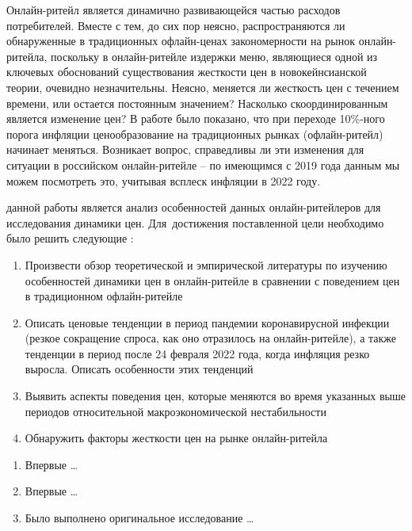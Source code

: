 Онлайн-ритейл является динамично развивающейся частью расходов потребителей. Вместе с тем, до сих пор неясно, распространяются ли обнаруженные в традиционных офлайн-ценах закономерности на рынок онлайн-ритейла, поскольку в онлайн-ритейле издержки меню, являющиеся одной из ключевых обоснований существования жесткости цен в новокейнсианской теории, очевидно незначительны. Неясно, меняется ли жесткость цен с течением времени, или остается постоянным значением? Насколько скоординированным является изменение цен? В работе \cite{gagnon2009} было показано, что при переходе 10\%-ного порога инфляции ценообразование на традиционных рынках (офлайн-ритейл) начинает меняться. Возникает вопрос, справедливы ли эти изменения для ситуации в российском онлайн-ритейле – по имеющимся с 2019 года данным мы можем посмотреть это, учитывая всплеск инфляции в 2022 году.


{\aim} данной работы является анализ особенностей данных онлайн-ритейлеров для исследования динамики цен.
Для~достижения поставленной цели необходимо было решить следующие {\tasks}:
\begin{enumerate}[beginpenalty=10000] %
  \item Произвести обзор теоретической и эмпирической литературы по изучению особенностей динамики цен в онлайн-ритейле в сравнении с поведением цен в традиционном офлайн-ритейле
  \item Описать ценовые тенденции в период пандемии коронавирусной инфекции (резкое сокращение спроса, как оно отразилось на онлайн-ритейле), а также тенденции в период после 24 февраля 2022 года, когда инфляция резко выросла. Описать особенности этих тенденций
  \item Выявить аспекты поведения цен, которые меняются во время указанных выше периодов относительной макроэкономической нестабильности
  \item Обнаружить факторы жесткости цен на рынке онлайн-ритейла 
\end{enumerate}


{\novelty}
\begin{enumerate}[beginpenalty=10000] %
  \item Впервые \ldots
  \item Впервые \ldots
  \item Было выполнено оригинальное исследование \ldots
\end{enumerate}

